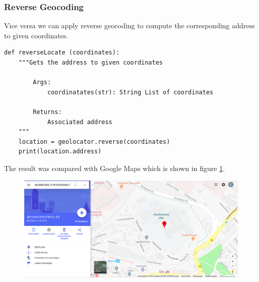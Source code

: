 \subsubsection{Reverse Geocoding}
Vice versa we can apply reverse geocoding to compute the corresponding address to given coordinates.
\begin{lstlisting}[breaklines=true]
def reverseLocate (coordinates):
    """Gets the address to given coordinates
        
        Args: 
            coordinatates(str): String List of coordinates
	        
        Returns: 
            Associated address  
    """
    location = geolocator.reverse(coordinates)
    print(location.address)
\end{lstlisting}
The result was compared with Google Maps which is shown in figure \ref{fig:geocode}.
\begin{figure}[H]
\hspace{-1.2cm}
\includegraphics[width=1.2\textwidth]{img/geocode}
\label{fig:geocode}
\end{figure}
